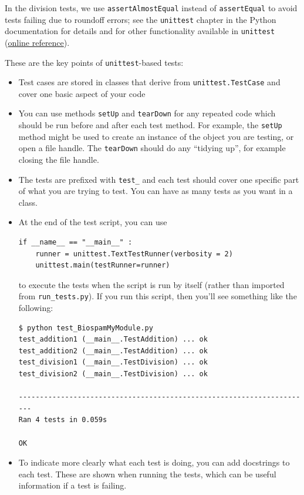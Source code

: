 \documentclass{report}
\begin{document}
In the division tests, we use \verb|assertAlmostEqual| instead of \verb|assertEqual| to avoid tests failing due to roundoff errors; see the \verb|unittest| chapter in the Python documentation for details and for other functionality available in \verb|unittest| (\href{http://docs.python.org/library/unittest.html}{online reference}).

These are the key points of \verb|unittest|-based tests:

\begin{itemize}
  \item Test cases are stored in classes that derive from
    \verb|unittest.TestCase| and cover one basic aspect of your code
    
  \item You can use methods \verb|setUp| and \verb|tearDown| for any repeated
    code which should be run before and after each test method.  For example,
    the \verb|setUp| method might be used to create an instance of the object
    you are testing, or open a file handle.  The \verb|tearDown| should do any
    ``tidying up'', for example closing the file handle.

  \item The tests are prefixed with \verb|test_| and each test should cover
    one specific part of what you are trying to test. You can have as
    many tests as you want in a class.

  \item At the end of the test script, you can use
\begin{verbatim}
if __name__ == "__main__" :
    runner = unittest.TextTestRunner(verbosity = 2)
    unittest.main(testRunner=runner)
\end{verbatim}
        to execute the tests when the script is run by itself (rather than
        imported from \verb|run_tests.py|).
        If you run this script, then you'll see something like the following:

\begin{verbatim}
$ python test_BiospamMyModule.py
test_addition1 (__main__.TestAddition) ... ok
test_addition2 (__main__.TestAddition) ... ok
test_division1 (__main__.TestDivision) ... ok
test_division2 (__main__.TestDivision) ... ok

----------------------------------------------------------------------
Ran 4 tests in 0.059s

OK
\end{verbatim}

  \item To indicate more clearly what each test is doing, you can add
        docstrings to each test.  These are shown when running the tests,
        which can be useful information if a test is failing.


\end{itemize}
\end{document}
